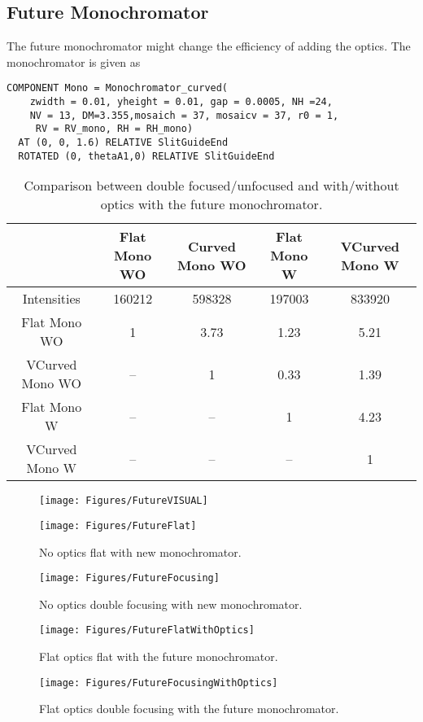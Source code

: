 \subsection{Future Monochromator}
The future monochromator might change the efficiency of adding the optics. The monochromator is given as
\lstset {language=C++}
\begin{lstlisting}
COMPONENT Mono = Monochromator_curved(
    zwidth = 0.01, yheight = 0.01, gap = 0.0005, NH =24,
    NV = 13, DM=3.355,mosaich = 37, mosaicv = 37, r0 = 1,
     RV = RV_mono, RH = RH_mono)
  AT (0, 0, 1.6) RELATIVE SlitGuideEnd
  ROTATED (0, thetaA1,0) RELATIVE SlitGuideEnd
\end{lstlisting}
\begin{table}[H]
\begin{tabular}{|c|c|c|c|c|}\hline
 & Flat Mono WO & Curved Mono WO  & Flat Mono W & VCurved Mono W\\ \hline
Intensities & 160212 & 598328 & 197003 & 833920 \\ \hline
Flat Mono WO & 1 & 3.73 & {\color{red}1.23} & 5.21 \\ \hline
VCurved Mono WO & -- & 1 & 0.33 & {\color{red}1.39} \\ \hline
Flat Mono W & -- & -- & 1 & 4.23 \\ \hline
VCurved Mono W & -- & -- & -- & 1 \\ \hline
\end{tabular}
\caption{Comparison between double focused/unfocused and with/without optics with the future monochromator.}
\end{table}
\begin{figure}[H]\centering
\texttt{[image: Figures/FutureVISUAL]}
\end{figure}

\begin{figure}[H]\centering
\texttt{[image: Figures/FutureFlat]}\caption{No optics flat with new monochromator.}
\texttt{[image: Figures/FutureFocusing]}\caption{No optics double focusing with new monochromator.}
\end{figure}
\begin{figure}[H]\centering
\texttt{[image: Figures/FutureFlatWithOptics]}\caption{Flat optics flat with the future monochromator.}
\texttt{[image: Figures/FutureFocusingWithOptics]}\caption{Flat optics double focusing with the future monochromator.}
\end{figure}


